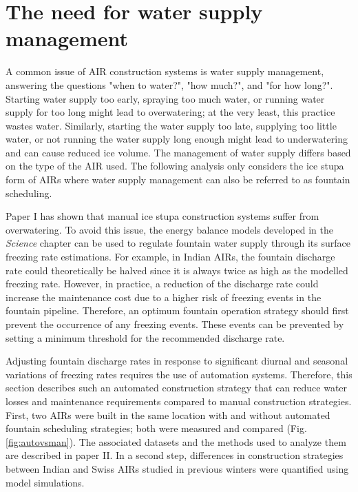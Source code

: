 \section{The need for water supply management}

A common issue of AIR construction systems is water supply management, answering the questions "when to
water?", "how much?", and "for how long?". Starting water supply too early, spraying too much water, or
running water supply for too long might lead to overwatering; at the very least, this practice wastes water.
Similarly, starting the water supply too late, supplying too little water, or not running the water supply long
enough might lead to underwatering and can cause reduced ice volume. The management of water supply
differs based on the type of the AIR used. The following analysis only considers the ice stupa
form of AIRs where water supply management can also be referred to as fountain scheduling.

Paper I has shown that manual ice stupa construction systems suffer from overwatering. To avoid this issue, the
energy balance models developed in the \textit{Science} chapter can be used to regulate fountain water supply
through its surface freezing rate estimations. For example, in Indian AIRs, the fountain discharge rate could
theoretically be halved since it is always twice as high as the modelled freezing rate. However, in practice, a
reduction of the discharge rate could increase the maintenance cost due to a higher risk of freezing events in
the fountain pipeline. Therefore, an optimum fountain operation strategy should first prevent the occurrence of
any freezing events. These events can be prevented by setting a minimum threshold for the recommended discharge
rate.

Adjusting fountain discharge rates in response to significant diurnal and seasonal variations of freezing rates
requires the use of automation systems. Therefore, this section describes such an automated construction
strategy that can reduce water losses and maintenance requirements compared to manual construction strategies.
First, two AIRs were built in the same location with and without automated fountain scheduling strategies; both
were measured and compared (Fig. \ref{fig:autovsman}). The associated datasets and the methods used to analyze
them are described in paper II. In a second step, differences in construction strategies between Indian and
Swiss AIRs studied in previous winters were quantified using model simulations. 


